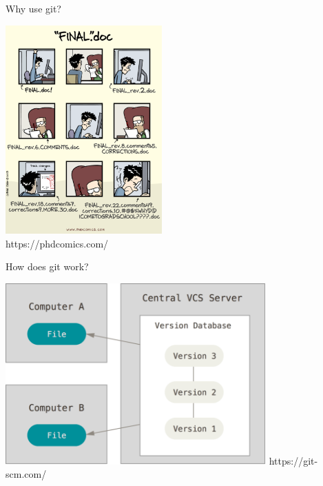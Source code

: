 \documentclass[12pt]{beamer}
\begin{document}
\begin{frame}

	\begin{flushright}
		\Large \textcolor{boss2}{Why use git?} 
	\end{flushright}

	\begin{center}
	  \includegraphics[width=0.45\textwidth]{figs/phd101212s.pdf} \\
		https://phdcomics.com/
	\end{center}

\end{frame}






\begin{frame}

	\begin{flushright}
		\Large \textcolor{boss2}{How does git work?} 
	\end{flushright}

	\begin{center}
	  \includegraphics[width=0.75\textwidth]{figs/centralized.png}
		https://git-scm.com/
	\end{center}

\end{frame}
\end{document}
